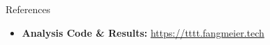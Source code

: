 \begin{frame}{References}
  \begin{itemize}
    \item \textbf{Analysis Code \& Results:}
      \url{https://tttt.fangmeier.tech}
  \end{itemize}
\end{frame}
